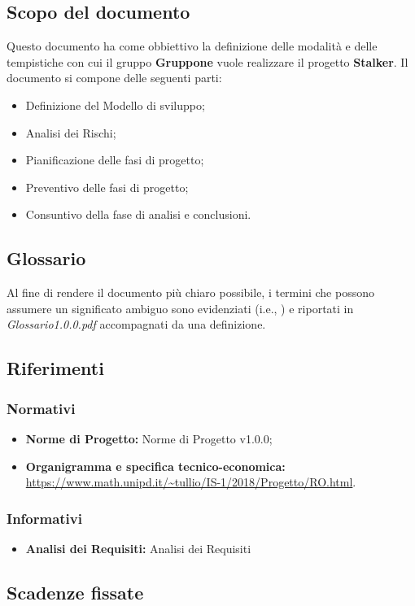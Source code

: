 \documentclass[../piano-di-progetto.tex]{subfiles}
\begin{document}
\subsection{Scopo del documento}%
\label{sub:scopo_del_documento}
Questo documento ha come obbiettivo la definizione delle modalità e delle tempistiche con cui il gruppo \textbf{Gruppone} vuole realizzare il progetto \textbf{Stalker}.
Il documento si compone delle seguenti parti:
\begin{itemize}
  \item Definizione del Modello di sviluppo;
  \item Analisi dei Rischi;
  \item Pianificazione delle fasi di progetto;
  \item Preventivo delle fasi di progetto;
  \item Consuntivo della fase di analisi e conclusioni.
\end{itemize}
\subsection{Glossario}%
\label{sub:glossario}
Al fine di rendere il documento più chiaro possibile, i termini che possono assumere un significato ambiguo sono evidenziati (i.e., ) e riportati in \textit{Glossario1.0.0.pdf} accompagnati da una definizione.
\subsection{Riferimenti}%
\label{sub:riferimenti}
\subsubsection{Normativi}%
\label{subs:normativi}
\begin{itemize}
  \item  \textbf{Norme di Progetto:} Norme di Progetto v1.0.0;
  \item  \textbf{Organigramma e specifica tecnico-economica:} \url{https://www.math.unipd.it/~tullio/IS-1/2018/Progetto/RO.html}.
\end{itemize}
\subsubsection{Informativi}%
\label{subs:informativi}
\begin{itemize}
  \item \textbf{Analisi dei Requisiti:} Analisi dei Requisiti
\end{itemize}
\subsection{Scadenze fissate}%
\label{sub:scadenze_fissate}

\end{document}
